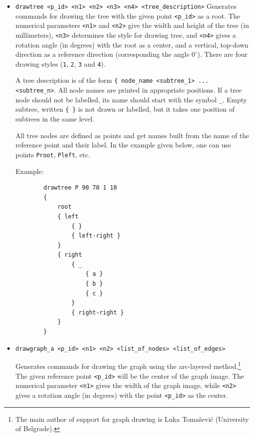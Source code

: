 \documentclass[a4paper]{book}
\begin{document}
\begin{itemize}
\item \verb|drawtree <p_id> <n1> <n2> <n3> <n4> <tree_description>|
        Genera\-tes commands for drawing the tree with the given point
        \verb|<p_id>| as a root. The numerical parameters \verb|<n1>|
        and \verb|<n2>| give the width and height of the tree (in millimeters),
        \verb|<n3>| determines the style for drawing tree, and \verb|<n4>|
        gives a rotation angle (in degrees) with the root as a center, and
        a vertical, top-down direction as a reference direction
        (corresponding the angle $0^\circ$). There are four drawing
        styles (\verb|1|, \verb|2|, \verb|3| and \verb|4|).

        A tree description is of the form \verb|{ node_name <subtree_1> ...| \verb|<subtree_n>|.
        All node names are printed in appropriate positions.
        If a tree node should not be labelled, its name should start with
        the symbol \verb|_|. Empty subtree, written \verb|{ }| is not drawn
        or labelled, but it takes one position of subtrees in the same level.

        All tree nodes are defined as {\sc point}s and get names built from
        the name of the reference point and their label. In the example
        given below, one can use points \verb|Proot|, \verb|Pleft|, etc.

        Example:

        \begin{verbatim}
        drawtree P 90 70 1 10
        {
            root
            { left
                { }
                { left-right }
            }
            { right
                { _
                    { a }
                    { b }
                    { c }
                }
                { right-right }
            }
        }
        \end{verbatim}

\item \verb|drawgraph_a <p_id> <n1> <n2> <list_of_nodes> <list_of_edges>|

        Generates commands for drawing the graph using the arc-layered
        method.\footnote{The main author of support for graph drawing is
        Luka Tomašević (University of Belgrade).} The given reference
        point \verb|<p_id>| will be the center of the graph image. The
        numerical parameter \verb|<n1>| gives the width of the graph image,
        while \verb|<n2>| gives a rotation angle (in degrees) with the
        point \verb|<p_id>| as the center.


\end{itemize}
\end{document}
